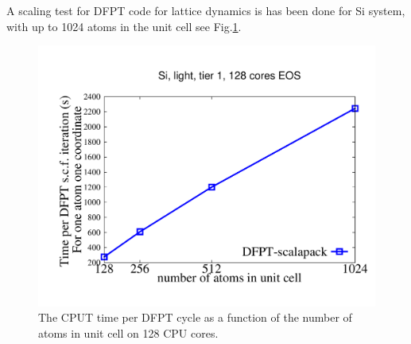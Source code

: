 A scaling test for DFPT code for lattice dynamics is has been done for Si system, with up to 1024 atoms in the unit cell see Fig.\ref{fig:scaling_Si}.
\begin{figure}
\includegraphics[width=1.0\columnwidth]{DFPT_scaling_Si}
\caption{The CPUT time per DFPT cycle as a function of the number of atoms in unit cell on 128 CPU cores.}
\label{fig:scaling_Si}
\end{figure}





